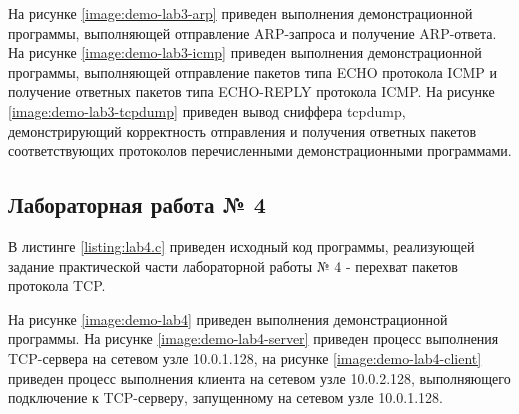 	На рисунке \ref{image:demo-lab3-arp} приведен выполнения демонстрационной программы, выполняющей отправление ARP-запроса и получение
	ARP-ответа. На рисунке \ref{image:demo-lab3-icmp} приведен выполнения демонстрационной программы, выполняющей отправление пакетов
	типа ECHO протокола ICMP и получение ответных пакетов типа ECHO-REPLY протокола ICMP. На рисунке \ref{image:demo-lab3-tcpdump} приведен вывод сниффера
	tcpdump, демонстрирующий корректность отправления и получения ответных пакетов соответствующих протоколов перечисленными демонстрационными программами.


	\subsection{Лабораторная работа № 4}

	В листинге \ref{listing:lab4.c} приведен исходный код программы, реализующей задание практической части лабораторной работы № 4 - перехват пакетов
	протокола TCP.

	На рисунке \ref{image:demo-lab4} приведен выполнения демонстрационной программы. На рисунке \ref{image:demo-lab4-server}
	приведен процесс выполнения TCP-сервера на сетевом узле 10.0.1.128, на рисунке \ref{image:demo-lab4-client} приведен процесс выполнения клиента на сетевом
	узле 10.0.2.128, выполняющего подключение к TCP-серверу, запущенному на сетевом узле 10.0.1.128.


